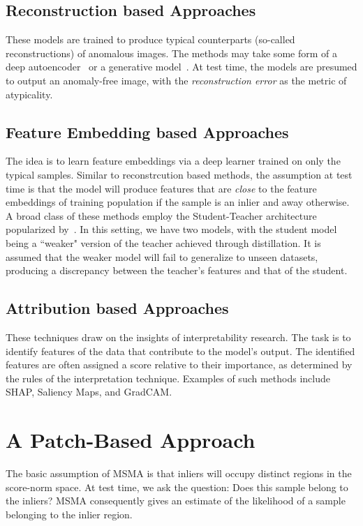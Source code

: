 \subsection*{Reconstruction based Approaches}
These models are trained to produce typical counterparts (so-called reconstructions) of anomalous images. The methods may take some form of a deep autoencoder~\cite{dae-kascenas22a,baur2021} or a generative model~\cite{wyattAnoddpmAnomalyDetection2022,pinaya2022fast}. At test time, the models are presumed to output an anomaly-free image, with the \textit{reconstruction error} as the metric of atypicality.

\subsection*{Feature Embedding based Approaches}
The idea is to learn feature embeddings via a deep learner trained on only the typical samples. Similar to reconstrcution based methods, the assumption at test time is that the model will produce features that are \textit{close} to the feature embeddings of training population if the sample is an inlier and away otherwise. A broad class of these methods employ the Student-Teacher architecture popularized by~\cite{bergmann2020uninformed}. In this setting, we have two models, with the student model being a ``weaker" version of the teacher achieved through distillation. It is assumed that the weaker model will fail to generalize to unseen datasets, producing a discrepancy between the teacher's features and that of the student.

\subsection*{Attribution based Approaches}
These techniques draw on the insights of interpretability research. The task is to identify features of the data that contribute to the model's output. The identified features are often assigned a score relative to their importance, as determined by the rules of the interpretation technique. Examples of such methods include SHAP, Saliency Maps, and GradCAM.


\section{A Patch-Based Approach}
The basic assumption of MSMA is that inliers will occupy distinct regions in the score-norm space. At test time, we ask the question: Does this sample belong to the inliers? MSMA consequently gives an estimate of the likelihood of a sample belonging to the inlier region. 

